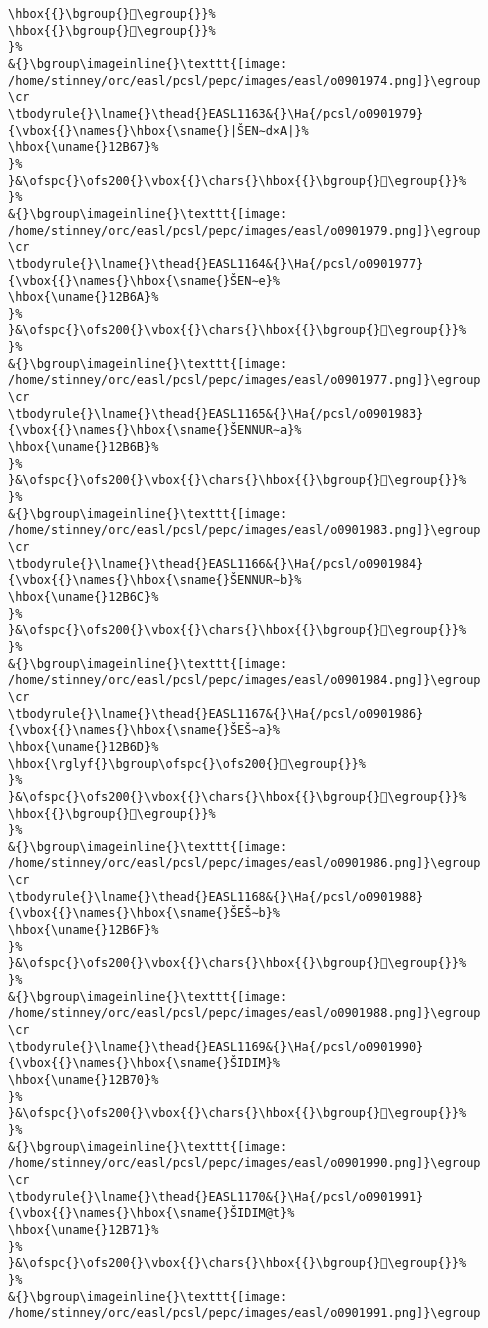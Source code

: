 \begin{verbatim}
\hbox{{}\bgroup{}𒭨\egroup{}}%
\hbox{{}\bgroup{}𒭩\egroup{}}%
}%
&{}\bgroup\imageinline{}\texttt{[image: /home/stinney/orc/easl/pcsl/pepc/images/easl/o0901974.png]}\egroup
\cr
\tbodyrule{}\lname{}\thead{}EASL1163&{}\Ha{/pcsl/o0901979}{\vbox{{}\names{}\hbox{\sname{}|ŠEN∼d×A|}%
\hbox{\uname{}12B67}%
}%
}&\ofspc{}\ofs200{}\vbox{{}\chars{}\hbox{{}\bgroup{}𒭧\egroup{}}%
}%
&{}\bgroup\imageinline{}\texttt{[image: /home/stinney/orc/easl/pcsl/pepc/images/easl/o0901979.png]}\egroup
\cr
\tbodyrule{}\lname{}\thead{}EASL1164&{}\Ha{/pcsl/o0901977}{\vbox{{}\names{}\hbox{\sname{}ŠEN∼e}%
\hbox{\uname{}12B6A}%
}%
}&\ofspc{}\ofs200{}\vbox{{}\chars{}\hbox{{}\bgroup{}𒭪\egroup{}}%
}%
&{}\bgroup\imageinline{}\texttt{[image: /home/stinney/orc/easl/pcsl/pepc/images/easl/o0901977.png]}\egroup
\cr
\tbodyrule{}\lname{}\thead{}EASL1165&{}\Ha{/pcsl/o0901983}{\vbox{{}\names{}\hbox{\sname{}ŠENNUR∼a}%
\hbox{\uname{}12B6B}%
}%
}&\ofspc{}\ofs200{}\vbox{{}\chars{}\hbox{{}\bgroup{}𒭫\egroup{}}%
}%
&{}\bgroup\imageinline{}\texttt{[image: /home/stinney/orc/easl/pcsl/pepc/images/easl/o0901983.png]}\egroup
\cr
\tbodyrule{}\lname{}\thead{}EASL1166&{}\Ha{/pcsl/o0901984}{\vbox{{}\names{}\hbox{\sname{}ŠENNUR∼b}%
\hbox{\uname{}12B6C}%
}%
}&\ofspc{}\ofs200{}\vbox{{}\chars{}\hbox{{}\bgroup{}𒭬\egroup{}}%
}%
&{}\bgroup\imageinline{}\texttt{[image: /home/stinney/orc/easl/pcsl/pepc/images/easl/o0901984.png]}\egroup
\cr
\tbodyrule{}\lname{}\thead{}EASL1167&{}\Ha{/pcsl/o0901986}{\vbox{{}\names{}\hbox{\sname{}ŠEŠ∼a}%
\hbox{\uname{}12B6D}%
\hbox{\rglyf{}\bgroup\ofspc{}\ofs200{}𒭭\egroup{}}%
}%
}&\ofspc{}\ofs200{}\vbox{{}\chars{}\hbox{{}\bgroup{}𒭭\egroup{}}%
\hbox{{}\bgroup{}𒭮\egroup{}}%
}%
&{}\bgroup\imageinline{}\texttt{[image: /home/stinney/orc/easl/pcsl/pepc/images/easl/o0901986.png]}\egroup
\cr
\tbodyrule{}\lname{}\thead{}EASL1168&{}\Ha{/pcsl/o0901988}{\vbox{{}\names{}\hbox{\sname{}ŠEŠ∼b}%
\hbox{\uname{}12B6F}%
}%
}&\ofspc{}\ofs200{}\vbox{{}\chars{}\hbox{{}\bgroup{}𒭯\egroup{}}%
}%
&{}\bgroup\imageinline{}\texttt{[image: /home/stinney/orc/easl/pcsl/pepc/images/easl/o0901988.png]}\egroup
\cr
\tbodyrule{}\lname{}\thead{}EASL1169&{}\Ha{/pcsl/o0901990}{\vbox{{}\names{}\hbox{\sname{}ŠIDIM}%
\hbox{\uname{}12B70}%
}%
}&\ofspc{}\ofs200{}\vbox{{}\chars{}\hbox{{}\bgroup{}𒭰\egroup{}}%
}%
&{}\bgroup\imageinline{}\texttt{[image: /home/stinney/orc/easl/pcsl/pepc/images/easl/o0901990.png]}\egroup
\cr
\tbodyrule{}\lname{}\thead{}EASL1170&{}\Ha{/pcsl/o0901991}{\vbox{{}\names{}\hbox{\sname{}ŠIDIM@t}%
\hbox{\uname{}12B71}%
}%
}&\ofspc{}\ofs200{}\vbox{{}\chars{}\hbox{{}\bgroup{}𒭱\egroup{}}%
}%
&{}\bgroup\imageinline{}\texttt{[image: /home/stinney/orc/easl/pcsl/pepc/images/easl/o0901991.png]}\egroup

\end{verbatim}
